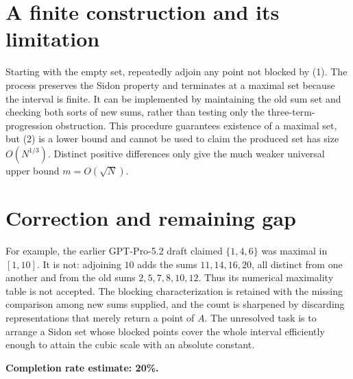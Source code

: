 \documentclass[11pt]{article}
\begin{document}
\section*{A finite construction and its limitation}
Starting with the empty set, repeatedly adjoin any point not blocked by (1). The process preserves the Sidon property and terminates at a maximal set because the interval is finite. It can be implemented by maintaining the old sum set and checking both sorts of new sums, rather than testing only the three-term-progression obstruction.
This procedure guarantees existence of a maximal set, but (2) is a lower bound and cannot be used to claim the produced set has size $O(N^{1/3})$. Distinct positive differences only give the much weaker universal upper bound $m=O(\sqrt N)$.

\section*{Correction and remaining gap}
For example, the earlier GPT-Pro-5.2 draft claimed $\{1,4,6\}$ was maximal in $[1,10]$. It is not: adjoining $10$ adds the sums $11,14,16,20$, all distinct from one another and from the old sums $2,5,7,8,10,12$. Thus its numerical maximality table is not accepted.
The blocking characterization is retained with the missing comparison among new sums supplied, and the count is sharpened by discarding representations that merely return a point of $A$. The unresolved task is to arrange a Sidon set whose blocked points cover the whole interval efficiently enough to attain the cubic scale with an absolute constant.

\textbf{Completion rate estimate: 20\%.}
\end{document}
